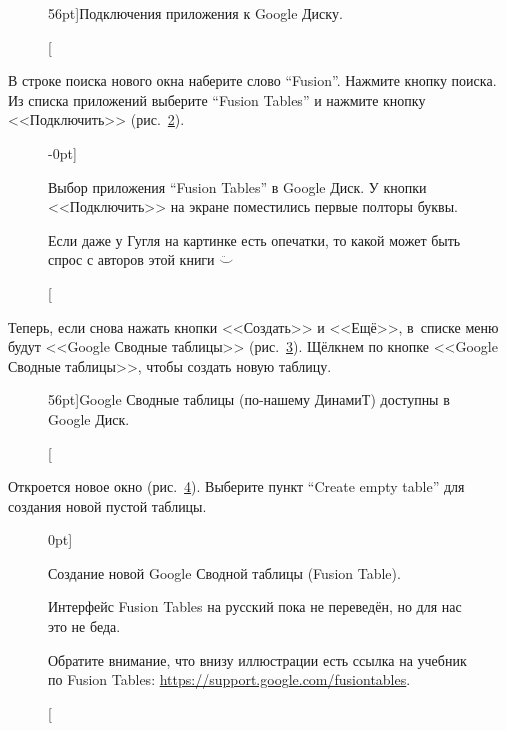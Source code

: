 \begin{figure}
{%
\setlength{\fboxsep}{0pt}%
\setlength{\fboxrule}{1pt}%
%
}%
    \caption[Подключения приложения к Google Диску.][56pt]{Подключения 
            приложения к Google Диску.
    }
  \label{fig:google_drive_connect_more_apps}
\end{figure}

В строке поиска нового окна наберите слово ``Fusion''. Нажмите кнопку поиска. 
Из списка приложений выберите ``Fusion Tables'' и нажмите кнопку <<Подключить>> 
(рис.~\ref{fig:add_fusion_to_drive}).

\begin{figure}
{%
\setlength{\fboxsep}{0pt}%
\setlength{\fboxrule}{1pt}%
%
}%
    \caption[Выбор приложения в Google Диск.][-0pt]{Выбор приложения 
            ``Fusion Tables'' в Google Диск. У кнопки <<Подключить>> 
            на экране поместились первые полторы буквы.

        { Если даже у Гугля на картинке есть опечатки, то какой может быть 
        спрос с авторов этой книги $\ddot\smile$
        }
    }
  \label{fig:add_fusion_to_drive}
\end{figure}

Теперь, если снова нажать кнопки <<Создать>> и <<Ещё>>, в~списке меню будут 
<<Google Сводные таблицы>> (рис.~\ref{fig:fusion_is_available_at_drive}).
Щёлкнем по кнопке <<Google Сводные таблицы>>, чтобы создать новую таблицу.

\begin{figure}
{%
\setlength{\fboxsep}{0pt}%
\setlength{\fboxrule}{1pt}%
%
}%
    \caption[Google Сводные таблицы доступны в Google Диск.][56pt]{Google Сводные таблицы 
            (по-нашему ДинамиТ) доступны в Google Диск.
    }
  \label{fig:fusion_is_available_at_drive}
\end{figure}

Откроется новое окно (рис.~\ref{fig:fusion_create_empty_table}). Выберите пункт 
``Create empty table'' для создания новой пустой таблицы.

\begin{figure}
{
\setlength{\fboxsep}{0pt}%
\setlength{\fboxrule}{1pt}%
%
}
    \caption[Создание новой Google Сводной таблицы.][0pt]{Создание новой 
            Google Сводной таблицы (Fusion Table).

            { 
                Интерфейс Fusion Tables на русский пока не переведён, 
                но для нас это не беда. 
            }

            {
                Обратите внимание, что внизу иллюстрации есть ссылка на учебник 
                по Fusion Tables: \url{https://support.google.com/fusiontables}.
            }
    }
  \label{fig:fusion_create_empty_table}
\end{figure}




